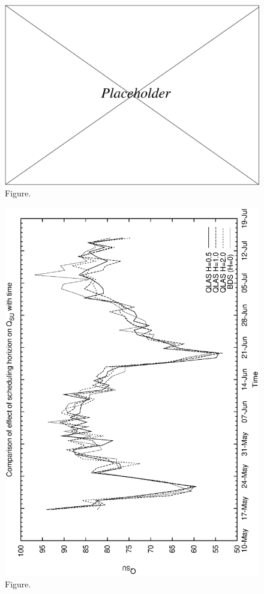 \documentclass[12pt,a4paper]{article}
\begin{document}
\clearpage
\begin{figure}[htbp]
 \begin{center}
  \includegraphics[scale=1.0, angle=0]{figures/placeholder.eps}
 \end{center}
  \caption[Figure.]
{Figure.}
\end{figure}
\clearpage
\begin{figure}[htbp]
 \begin{center}
  \includegraphics[scale=1.0, angle=0]{figures/qsa3_su.eps}
 \end{center}
  \caption[Figure.]
{Figure.}
\end{figure}
\end{document}
